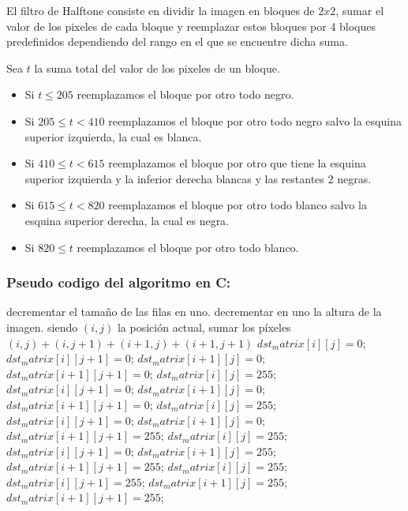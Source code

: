 El filtro de Halftone consiste en dividir la imagen en bloques de $2x2$, sumar el valor de los pixeles de cada bloque y reemplazar estos bloques por 4 bloques predefinidos dependiendo del rango en el que se encuentre dicha suma. 

Sea $t$ la suma total del valor de los pixeles de un bloque.

\begin{itemize}
\item Si $t \leq 205$ reemplazamos el bloque por otro todo negro.
\item Si $205 \leq t < 410$ reemplazamos el bloque por otro todo negro salvo la esquina superior izquierda, la cual es blanca.
\item Si $410 \leq t < 615$ reemplazamos el bloque por otro que tiene la esquina superior izquierda y la inferior derecha blancas y las restantes 2 negras.
\item Si $615 \leq t < 820$ reemplazamos el bloque por otro todo blanco salvo la esquina superior derecha, la cual es negra.
\item Si $820 \leq t$ reemplazamos el bloque por otro todo blanco.
\end{itemize}

\subsubsection{Pseudo codigo del algoritmo en C:}


\begin{pseudocodigo}
    	\STATE decrementar el tamaño de las filas en uno.
    \ENDIF
    	\STATE decrementar en uno la altura de la imagen.
	\ENDIF
	\STATE
			\STATE
			\STATE siendo $(i,j)$ la posición actual, sumar los píxeles $(i,j)+(i,j+1)+(i+1,j)+(i+1,j+1)$
			\STATE
				\STATE 
				\STATE  $dst_matrix[i][j] 		= 0$;
				\STATE	$dst_matrix[i][j+1] 	= 0$;
				\STATE	$dst_matrix[i+1][j] 	= 0$;
				\STATE	$dst_matrix[i+1][j+1]	= 0$;
			\ELSE
					\STATE
					\STATE  $dst_matrix[i][j] 		= 255$;
					\STATE	$dst_matrix[i][j+1] 	= 0$;
					\STATE	$dst_matrix[i+1][j] 	= 0$;
					\STATE	$dst_matrix[i+1][j+1]	= 0$;
				\ELSE
						\STATE
						\STATE  $dst_matrix[i][j] 		= 255$;
						\STATE	$dst_matrix[i][j+1] 	= 0$;
						\STATE	$dst_matrix[i+1][j] 	= 0$;
						\STATE	$dst_matrix[i+1][j+1]	= 255$;
					\ELSE
							\STATE
							\STATE  $dst_matrix[i][j] 		= 255$;
							\STATE	$dst_matrix[i][j+1] 	= 0$;
							\STATE	$dst_matrix[i+1][j] 	= 255$;
							\STATE	$dst_matrix[i+1][j+1]	= 255$;
						\ELSE 
							\STATE
							\STATE  $dst_matrix[i][j] 		= 255$;
							\STATE	$dst_matrix[i][j+1] 	= 255$;
							\STATE	$dst_matrix[i+1][j] 	= 255$;
							\STATE	$dst_matrix[i+1][j+1]	= 255$;
						\ENDIF
					\ENDIF
				\ENDIF
			\ENDIF
		\ENDFOR
	\ENDFOR
\end{pseudocodigo}

